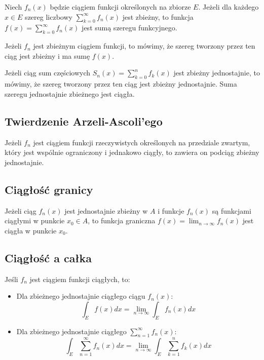 \documentclass{../notatki}
\begin{document}
Niech $f_n(x)$ będzie ciągiem funkcji określonych na zbiorze $E$. Jeżeli dla
każdego $x \in E$ szereg liczbowy $\sum_{k=0}^\infty f_n(x)$ jest zbieżny, to
funkcja $f(x) = \sum_{k=0}^\infty f_n(x)$ jest sumą szeregu funkcyjnego.

Jeżeli $f_n$ jest zbieżnym ciągiem funkcji, to mówimy, że szereg tworzony
przez ten ciąg jest zbieżny i ma sumę $f(x)$.

Jeżeli ciąg sum częściowych $S_n(x) = \sum_{k=0}^n f_k(x)$ jest zbieżny
jednostajnie, to mówimy, że szereg tworzony przez ten ciąg jest zbieżny
jednostajnie. Suma szeregu jednostajnie zbieżnego jest ciągła.

\subsection{Twierdzenie Arzeli-Ascoli'ego}

Jeżeli $f_n$ jest ciągiem funkcji rzeczywistych określonych na przedziale
zwartym, który jest wspólnie ograniczony i jednakowo ciągły, to zawiera
on podciąg zbieżny jednostajnie.


\subsection{Ciągłość granicy}

Jeżeli ciąg $f_n(x)$ jest jednostajnie zbieżny w $A$ i funkcje $f_n(x)$ są
funkcjami ciągłymi w punkcie $x_0 \in A$, to funkcja graniczna $f(x)
= \lim_{n \to \infty} f_n(x)$ jest ciągła w punkcie $x_0$.

\subsection{Ciągłość a całka}

Jeśli $f_n$ jest ciągiem funkcji ciągłych, to:
\begin{itemize}
  \item Dla zbieżnego jednostajnie ciągłego ciągu $f_n(x)$:
    $$
    \int_E f(x) dx = \lim_{n \to \infty} \int_E f_n(x) dx
    $$
  \item Dla zbieżnego jednostajnie ciągłego $\sum_{n=1}^\infty f_n(x)$:
    $$
    \int_E \sum_{n=1}^\infty f_n(x) dx = \lim_{n \to \infty} \int_E
    \sum_{k=1}^n f_k(x) dx
    $$
\end{itemize}
\end{document}
